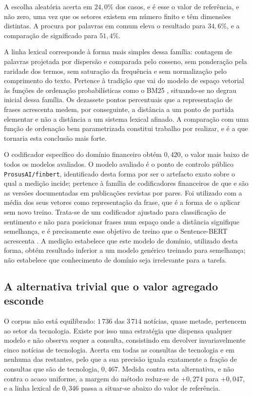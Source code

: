 A escolha aleatória acerta em $24{,}0\%$ dos casos, e é esse o valor de referência, e não zero, uma
vez que os setores existem em número finito e têm dimensões distintas. A procura por palavras em
comum eleva o resultado para $34{,}6\%$, e a comparação de significado para $51{,}4\%$.

A linha lexical corresponde à forma mais simples dessa família: contagem de palavras projetada por
dispersão e comparada pelo cosseno, sem ponderação pela raridade dos termos, sem saturação da
frequência e sem normalização pelo comprimento do texto. Pertence à tradição que vai do modelo de
espaço vetorial \autocite{salton1975vsm} às funções de ordenação probabilísticas como o BM25
\autocite{robertson2009bm25}, situando-se no degrau inicial dessa família. Os dezassete pontos
percentuais que a representação de frases \autocite{reimers2019sbert} acrescenta medem, por
conseguinte, a distância a um ponto de partida elementar e não a distância a um sistema lexical
afinado. A comparação com uma função de ordenação bem parametrizada constitui trabalho por realizar,
e é a que tornaria esta conclusão mais forte.

O codificador específico do domínio financeiro obtém $0{,}420$, o valor mais baixo de todos os
modelos avaliados. O modelo avaliado é o ponto de controlo público \texttt{ProsusAI/finbert},
identificado desta forma por ser o artefacto exato sobre o qual a medição incide; pertence à
família de codificadores financeiros de que \textcite{liu2020finbert} e \textcite{huang2023finbert}
são as versões documentadas em publicações revistas por pares. Foi utilizado com a média dos seus vetores como
representação da frase, que é a forma de o aplicar sem novo treino. Trata-se de um codificador
ajustado para classificação de sentimento e não para posicionar frases num espaço onde a distância
signifique semelhança, e é precisamente esse objetivo de treino que o Sentence-BERT acrescenta
\autocite{reimers2019sbert}. A medição estabelece que este modelo de domínio, utilizado desta forma,
obtém resultado inferior a um modelo genérico treinado para semelhança; não estabelece que
conhecimento de domínio seja irrelevante para a tarefa.

\subsection{A alternativa trivial que o valor agregado esconde}

O corpus não está equilibrado: $1\,736$ das $3\,714$ notícias, quase metade, pertencem ao setor da
tecnologia. Existe por isso uma estratégia que dispensa qualquer modelo e não observa sequer a
consulta, consistindo em devolver invariavelmente cinco notícias de tecnologia. Acerta em todas as
consultas de tecnologia e em nenhuma das restantes, pelo que a sua precisão iguala exatamente a
fração de consultas que são de tecnologia, $0{,}467$. Medida contra esta alternativa, e não contra o
acaso uniforme, a margem do método reduz-se de $+0{,}274$ para $+0{,}047$, e a linha lexical de
$0{,}346$ passa a situar-se abaixo do valor de referência.

